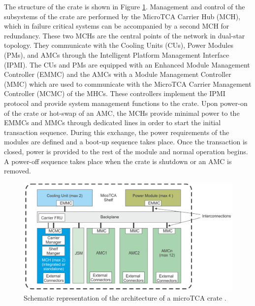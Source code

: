       The structure of the crate is shown in Figure \ref{fig:II-2-utca-crate}. Management and control of the subsystems of the crate are performed by the MicroTCA Carrier Hub (MCH), which in failure critical systems can be accompanied by a second MCH for redundancy. These two MCHs are the central points of the network in dual-star topology. They communicate with the Cooling Units (CUs), Power Modules (PMs), and AMCs through the Intelligent Platform Management Interface (IPMI). The CUs and PMs are equipped with an Enhanced Module Management Controller (EMMC) and the AMCs with a Module Management Controller (MMC) which are used to communicate with the MicroTCA Carrier Management Controller (MCMC) of the MHCs. These controllers implement the IPMI protocol and provide system management functions to the crate. Upon power-on of the crate or hot-swap of an AMC, the MCHs provide minimal power to the EMMCs and MMCs through dedicated lines in order to start the initial transaction sequence. During this exchange, the power requirements of the modules are defined and a boot-up sequence takes place. Once the transaction is closed, power is provided to the rest of the module and normal operation begins. A power-off sequence takes place when the crate is shutdown or an AMC is removed. \\

      \begin{figure}[h!]
        \centering
        \includegraphics[width=\textwidth]{img/II-2-daq/utca-crate.png}
        \caption{Schematic representation of the architecture of a microTCA crate \cite{VADATECH}.}
        \label{fig:II-2-utca-crate}
      \end{figure}

